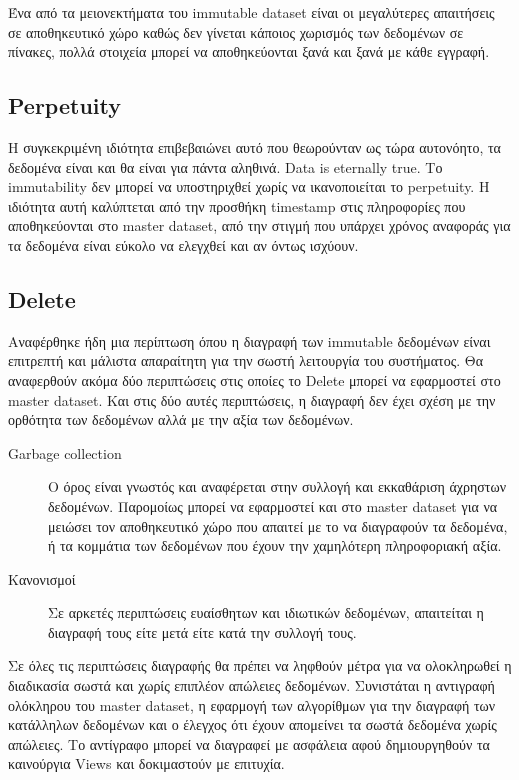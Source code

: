 Ένα από τα μειονεκτήματα του immutable dataset είναι οι μεγαλύτερες απαιτήσεις σε αποθηκευτικό χώρο καθώς δεν γίνεται κάποιος χωρισμός των δεδομένων σε πίνακες, πολλά στοιχεία μπορεί να αποθηκεύονται ξανά και ξανά με κάθε εγγραφή. 

\subsection{Perpetuity}
Η συγκεκριμένη ιδιότητα επιβεβαιώνει αυτό που θεωρούνταν ως τώρα αυτονόητο, τα δεδομένα είναι και θα είναι για πάντα αληθινά. Data is eternally true. Το immutability δεν μπορεί να υποστηριχθεί χωρίς να ικανοποιείται το perpetuity. Η ιδιότητα αυτή καλύπτεται από την προσθήκη timestamp στις πληροφορίες που αποθηκεύονται στο master dataset, από την στιγμή που υπάρχει χρόνος αναφοράς για τα δεδομένα είναι εύκολο να ελεγχθεί και αν όντως ισχύουν.

\subsection{Delete}
Αναφέρθηκε ήδη μια περίπτωση όπου η διαγραφή των immutable δεδομένων είναι επιτρεπτή και μάλιστα απαραίτητη για την σωστή λειτουργία του συστήματος. Θα αναφερθούν ακόμα δύο περιπτώσεις στις οποίες το Delete μπορεί να εφαρμοστεί στο master dataset. Και στις δύο αυτές περιπτώσεις, η διαγραφή δεν έχει σχέση με την ορθότητα των δεδομένων αλλά με την αξία των δεδομένων. 
\begin{description}
\item [Garbage collection] Ο όρος είναι γνωστός και αναφέρεται στην συλλογή και εκκαθάριση άχρηστων δεδομένων. Παρομοίως μπορεί να εφαρμοστεί και στο master dataset για να μειώσει τον αποθηκευτικό χώρο που απαιτεί με το να διαγραφούν τα δεδομένα, ή τα κομμάτια των δεδομένων που έχουν την χαμηλότερη πληροφοριακή αξία. 
\item [Κανονισμοί] Σε αρκετές περιπτώσεις ευαίσθητων και ιδιωτικών δεδομένων, απαιτείται η διαγραφή τους είτε μετά είτε κατά την συλλογή τους.
\end{description}

 Σε όλες τις περιπτώσεις διαγραφής θα πρέπει να ληφθούν μέτρα για να ολοκληρωθεί η διαδικασία σωστά και χωρίς επιπλέον απώλειες δεδομένων.
Συνιστάται η αντιγραφή ολόκληρου του master dataset, η εφαρμογή των αλγορίθμων για την διαγραφή των κατάλληλων δεδομένων και ο έλεγχος ότι έχουν απομείνει τα σωστά δεδομένα χωρίς απώλειες. Το αντίγραφο μπορεί να διαγραφεί με ασφάλεια αφού δημιουργηθούν τα καινούργια Views και δοκιμαστούν με επιτυχία.

